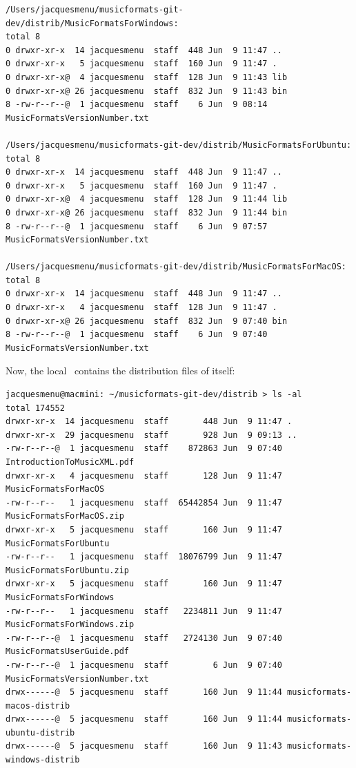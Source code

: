 \begin{enumerate}
\begin{lstlisting}[language=TerminalSmall]
/Users/jacquesmenu/musicformats-git-dev/distrib/MusicFormatsForWindows:
total 8
0 drwxr-xr-x  14 jacquesmenu  staff  448 Jun  9 11:47 ..
0 drwxr-xr-x   5 jacquesmenu  staff  160 Jun  9 11:47 .
0 drwxr-xr-x@  4 jacquesmenu  staff  128 Jun  9 11:43 lib
0 drwxr-xr-x@ 26 jacquesmenu  staff  832 Jun  9 11:43 bin
8 -rw-r--r--@  1 jacquesmenu  staff    6 Jun  9 08:14 MusicFormatsVersionNumber.txt

/Users/jacquesmenu/musicformats-git-dev/distrib/MusicFormatsForUbuntu:
total 8
0 drwxr-xr-x  14 jacquesmenu  staff  448 Jun  9 11:47 ..
0 drwxr-xr-x   5 jacquesmenu  staff  160 Jun  9 11:47 .
0 drwxr-xr-x@  4 jacquesmenu  staff  128 Jun  9 11:44 lib
0 drwxr-xr-x@ 26 jacquesmenu  staff  832 Jun  9 11:44 bin
8 -rw-r--r--@  1 jacquesmenu  staff    6 Jun  9 07:57 MusicFormatsVersionNumber.txt

/Users/jacquesmenu/musicformats-git-dev/distrib/MusicFormatsForMacOS:
total 8
0 drwxr-xr-x  14 jacquesmenu  staff  448 Jun  9 11:47 ..
0 drwxr-xr-x   4 jacquesmenu  staff  128 Jun  9 11:47 .
0 drwxr-xr-x@ 26 jacquesmenu  staff  832 Jun  9 07:40 bin
8 -rw-r--r--@  1 jacquesmenu  staff    6 Jun  9 07:40 MusicFormatsVersionNumber.txt
\end{lstlisting}

Now, the local \masterBranch\ contains the distribution files of itself:
\begin{lstlisting}[language=TerminalSmall]
jacquesmenu@macmini: ~/musicformats-git-dev/distrib > ls -al
total 174552
drwxr-xr-x  14 jacquesmenu  staff       448 Jun  9 11:47 .
drwxr-xr-x  29 jacquesmenu  staff       928 Jun  9 09:13 ..
-rw-r--r--@  1 jacquesmenu  staff    872863 Jun  9 07:40 IntroductionToMusicXML.pdf
drwxr-xr-x   4 jacquesmenu  staff       128 Jun  9 11:47 MusicFormatsForMacOS
-rw-r--r--   1 jacquesmenu  staff  65442854 Jun  9 11:47 MusicFormatsForMacOS.zip
drwxr-xr-x   5 jacquesmenu  staff       160 Jun  9 11:47 MusicFormatsForUbuntu
-rw-r--r--   1 jacquesmenu  staff  18076799 Jun  9 11:47 MusicFormatsForUbuntu.zip
drwxr-xr-x   5 jacquesmenu  staff       160 Jun  9 11:47 MusicFormatsForWindows
-rw-r--r--   1 jacquesmenu  staff   2234811 Jun  9 11:47 MusicFormatsForWindows.zip
-rw-r--r--@  1 jacquesmenu  staff   2724130 Jun  9 07:40 MusicFormatsUserGuide.pdf
-rw-r--r--@  1 jacquesmenu  staff         6 Jun  9 07:40 MusicFormatsVersionNumber.txt
drwx------@  5 jacquesmenu  staff       160 Jun  9 11:44 musicformats-macos-distrib
drwx------@  5 jacquesmenu  staff       160 Jun  9 11:44 musicformats-ubuntu-distrib
drwx------@  5 jacquesmenu  staff       160 Jun  9 11:43 musicformats-windows-distrib
\end{lstlisting}



\end{enumerate}
